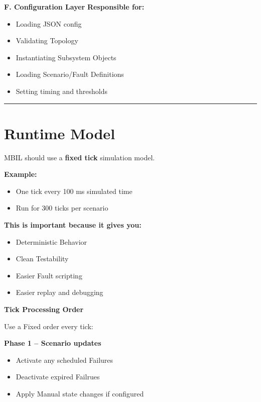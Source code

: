 \documentclass{report}
\begin{document}
\vspace{\baselineskip} \textbf{F. Configuration Layer}
\textbf{Responsible for:}
\begin{itemize}
   \item Loading JSON config
   \item Validating Topology
   \item Instantiating Subsystem Objects
   \item Loading Scenario/Fault Definitions
   \item Setting timing and thresholds
\end{itemize}

\begin{center}
\rule{0.9\textwidth}{1pt}
\end{center}
\section{Runtime Model}
MBIL should use a \textbf{fixed tick} simulation model. 

\textbf{Example:}
\begin{itemize}
   \item One tick every 100 ms simulated time 
   \item Run for 300 ticks per scenario
\end{itemize}

\textbf{This is important because it gives you:}
\begin{itemize}
   \item Deterministic Behavior
   \item Clean Testability
   \item Easier Fault scripting
   \item Easier replay and debugging
\end{itemize}

\textbf{Tick Processing Order}

Use a Fixed order every tick:

\textbf{Phase 1 -- Scenario updates}
\begin{itemize}
   \item Activate any scheduled Failures
   \item Deactivate expired Failrues 
   \item Apply Manual state changes if configured 
\end{itemize}
\end{document}
